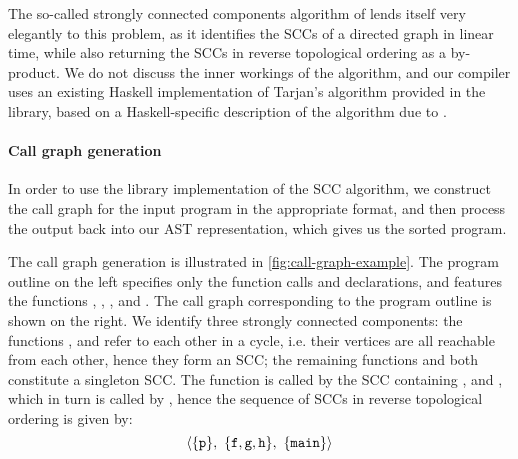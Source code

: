 The so-called strongly connected components algorithm of \citet{Tarjan1972}
lends itself very elegantly to this problem, as it identifies the SCCs of a
directed graph in linear time, while also returning the SCCs in reverse
topological ordering as a by-product.
We do not discuss the inner workings of the algorithm, and our compiler uses an
existing Haskell implementation of Tarjan's algorithm provided in the
 library, based on a Haskell-specific description of
the algorithm due to \citet{King1995}.

\paragraph{Call graph generation}
In order to use the library implementation of the SCC algorithm, we construct
the call graph for the input program in the appropriate format, and then process
the output back into our AST representation, which gives us the sorted program.

The call graph generation is illustrated in \cref{fig:call-graph-example}. The
program outline on the left specifies only the function calls and declarations,
and features the functions , , ,  and
.
The call graph corresponding to the program outline is shown on the right.
We identify three strongly connected components: the functions ,
 and  refer to each other in a cycle, i.e. their vertices are
all reachable from each other, hence they form an SCC; the remaining functions
 and  both constitute a singleton SCC.
The function  is called by the SCC containing ,  and
, which in turn is called by , hence the sequence of SCCs in
reverse topological ordering is given by:
\[ \langle \{ \texttt{p} \},\ \{ \texttt{f}, \texttt{g}, \texttt{h} \},\ \{ \texttt{main} \} \rangle \]

